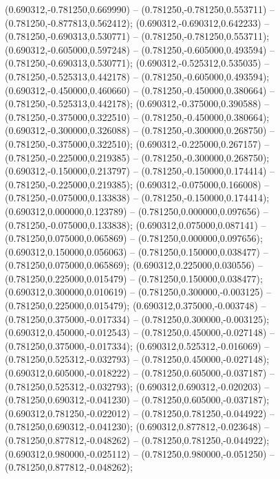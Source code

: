  (0.690312,-0.781250,0.669990) -- (0.781250,-0.781250,0.553711) -- (0.781250,-0.877813,0.562412);
 (0.690312,-0.690312,0.642233) -- (0.781250,-0.690313,0.530771) -- (0.781250,-0.781250,0.553711);
 (0.690312,-0.605000,0.597248) -- (0.781250,-0.605000,0.493594) -- (0.781250,-0.690313,0.530771);
 (0.690312,-0.525312,0.535035) -- (0.781250,-0.525313,0.442178) -- (0.781250,-0.605000,0.493594);
 (0.690312,-0.450000,0.460660) -- (0.781250,-0.450000,0.380664) -- (0.781250,-0.525313,0.442178);
 (0.690312,-0.375000,0.390588) -- (0.781250,-0.375000,0.322510) -- (0.781250,-0.450000,0.380664);
 (0.690312,-0.300000,0.326088) -- (0.781250,-0.300000,0.268750) -- (0.781250,-0.375000,0.322510);
 (0.690312,-0.225000,0.267157) -- (0.781250,-0.225000,0.219385) -- (0.781250,-0.300000,0.268750);
 (0.690312,-0.150000,0.213797) -- (0.781250,-0.150000,0.174414) -- (0.781250,-0.225000,0.219385);
 (0.690312,-0.075000,0.166008) -- (0.781250,-0.075000,0.133838) -- (0.781250,-0.150000,0.174414);
 (0.690312,0.000000,0.123789) -- (0.781250,0.000000,0.097656) -- (0.781250,-0.075000,0.133838);
 (0.690312,0.075000,0.087141) -- (0.781250,0.075000,0.065869) -- (0.781250,0.000000,0.097656);
 (0.690312,0.150000,0.056063) -- (0.781250,0.150000,0.038477) -- (0.781250,0.075000,0.065869);
 (0.690312,0.225000,0.030556) -- (0.781250,0.225000,0.015479) -- (0.781250,0.150000,0.038477);
 (0.690312,0.300000,0.010619) -- (0.781250,0.300000,-0.003125) -- (0.781250,0.225000,0.015479);
 (0.690312,0.375000,-0.003748) -- (0.781250,0.375000,-0.017334) -- (0.781250,0.300000,-0.003125);
 (0.690312,0.450000,-0.012543) -- (0.781250,0.450000,-0.027148) -- (0.781250,0.375000,-0.017334);
 (0.690312,0.525312,-0.016069) -- (0.781250,0.525312,-0.032793) -- (0.781250,0.450000,-0.027148);
 (0.690312,0.605000,-0.018222) -- (0.781250,0.605000,-0.037187) -- (0.781250,0.525312,-0.032793);
 (0.690312,0.690312,-0.020203) -- (0.781250,0.690312,-0.041230) -- (0.781250,0.605000,-0.037187);
 (0.690312,0.781250,-0.022012) -- (0.781250,0.781250,-0.044922) -- (0.781250,0.690312,-0.041230);
 (0.690312,0.877812,-0.023648) -- (0.781250,0.877812,-0.048262) -- (0.781250,0.781250,-0.044922);
 (0.690312,0.980000,-0.025112) -- (0.781250,0.980000,-0.051250) -- (0.781250,0.877812,-0.048262);
